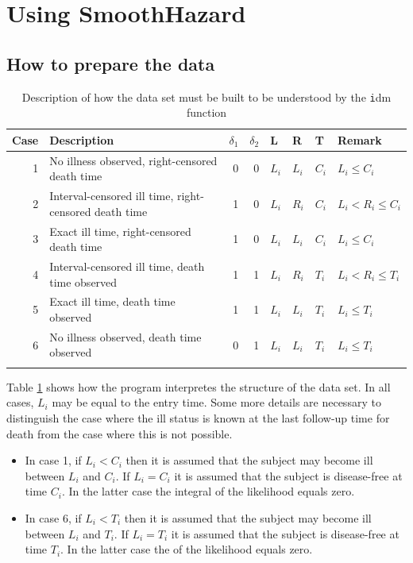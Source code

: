 \documentclass{article}
\newcommand{\code}[1]{{\texttt #1}}
\begin{document}
\section{Using SmoothHazard}
\label{sec-5}

\subsection{How to prepare the data}
\label{sec-5-1}
\begin{table}
\centering
\begin{tabular}{rm{13em}rrllll}
Case & Description & $\delta_1$ & $\delta_2$ & L & R & T & Remark\\
\hline
1 & No illness observed, right-censored death time & 0 & 0 & $L_i$ & $L_i$ & $C_i$ & $L_i\le C_i$\\
2 & Interval-censored ill time, right-censored death time & 1 & 0 & $L_i$ & $R_i$ & $C_i$ & $L_i<R_i\le C_i$\\
3 & Exact ill time, right-censored death time & 1 & 0 & $L_i$ & $L_i$ & $C_i$ & $L_i\le C_i$\\
4 & Interval-censored ill time, death time observed & 1 & 1 & $L_i$ & $R_i$ & $T_i$ & $L_i<R_i\le T_i$\\
5 & Exact ill time, death time observed & 1 & 1 & $L_i$ & $L_i$ & $T_i$ & $L_i\le T_i$\\
6 & No illness observed, death time observed & 0 & 1 & $L_i$ & $L_i$ & $T_i$ & $L_i\le T_i$\\
 &  &  &  &  &  &  & \\
\end{tabular}
\caption{Description of how the data set must be built to be understood by the \code{idm} function}
\label{tab:XX}
\end{table}

Table \ref{tab:XX} shows how the program interpretes the structure of the data
set. In all cases, $L_i$ may be equal to the entry time. 
Some more details are necessary to distinguish the case where the
ill status is known at the last follow-up time for death from the case where
this is not possible. 

\begin{itemize}
\item In case 1, if $L_i<C_i$ then it is assumed that the subject may
become ill between $L_i$ and $C_i$. If $L_i=C_i$ it is assumed that
the subject is disease-free at time $C_i$. In the latter case the
integral of the likelihood equals zero.
\item In case 6, if  $L_i<T_i$ then it is assumed that the subject may
become ill between $L_i$ and $T_i$. If $L_i=T_i$ it is assumed that
the subject is disease-free at time $T_i$. In the latter case the
of the likelihood equals zero.
\end{itemize}
\end{document}
